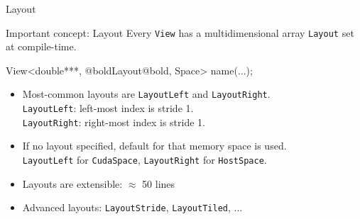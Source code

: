 \begin{frame}[fragile]{Layout}

  \begin{block}{Important concept: Layout}
    Every \texttt{View} has a multidimensional array \texttt{Layout} set at compile-time.
  \end{block}

  \vspace{5pt}

  \begin{code}[frame=single, keywords={}]
View<double***, @boldLayout@bold, Space> name(...);
  \end{code}

  \pause
  \vspace{-5pt}

  \begin{itemize}
    \item{Most-common layouts are \texttt{LayoutLeft} and \texttt{LayoutRight}. \\
      \hspace{10pt} \texttt{LayoutLeft}: left-most index is stride 1.\\
      \hspace{10pt} \texttt{LayoutRight}: right-most index is stride 1.}
    \item{If no layout specified, default for that memory space is used. \\
      \hspace{10pt} \texttt{LayoutLeft} for \texttt{CudaSpace}, \texttt{LayoutRight} for \texttt{HostSpace}.}
    \item{Layouts are extensible: $\approx$ 50 lines}
    \item{Advanced layouts: \texttt{LayoutStride}, \texttt{LayoutTiled}, ...}
  \end{itemize}

  \vspace{-15pt}

\end{frame}


